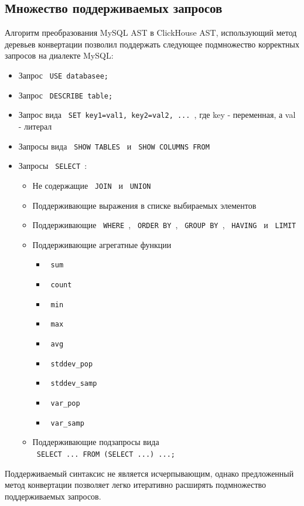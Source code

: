 \subsection{Множество поддерживаемых запросов} \label{part:queries}
Алгоритм преобразования MySQL AST в ClickHouse AST, использующий метод деревьев конвертации позволил поддержать следующее подмножество корректных запросов на диалекте MySQL:
\begin{itemize}
    \item Запрос \texttt{ USE databasee; }
    \item Запрос \texttt{ DESCRIBE table; }
    \item Запрос вида \texttt{ SET key1=val1, key2=val2, ... }, где key - переменная, а val - литерал
    \item Запросы вида \texttt{ SHOW TABLES } и \texttt{ SHOW COLUMNS FROM }
    \item Запросы \texttt{ SELECT }:
    \begin{itemize}
        \item Не содержащие \texttt{ JOIN } и \texttt{ UNION }
        \item Поддерживающие выражения в списке выбираемых элементов
        \item Поддерживающие \texttt{ WHERE }, \texttt{ ORDER BY }, \texttt{ GROUP BY }, \texttt{ HAVING } и \texttt{ LIMIT }
        \item Поддерживающие агрегатные функции 
        \begin{itemize}
            \item \texttt{ sum }
            \item \texttt{ count }
            \item \texttt{ min }
            \item \texttt{ max }
            \item \texttt{ avg }
            \item \texttt{ stddev_pop}
            \item \texttt{ stddev_samp }
            \item \texttt{ var_pop }
            \item \texttt{ var_samp }
        \end{itemize}
        \item Поддерживающие подзапросы вида \\ \texttt{ SELECT ... FROM (SELECT ...) ...; }
    \end{itemize}
\end{itemize}

Поддерживаемый синтаксис не является исчерпывающим, однако предложенный метод конвертации позволяет легко итеративно расширять подмножество поддерживаемых запросов.
